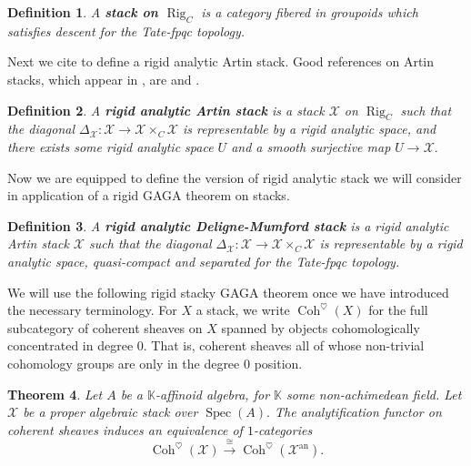 \documentclass[11pt]{amsart}
\newtheorem{theorem}{Theorem}[section]
\newtheorem{definition}[theorem]{Definition}
\theoremstyle{definition}
\numberwithin{equation}{section}
\newcommand{\Spec}{\operatorname{Spec}} 	%
\newcommand{\sX}{\mathscr{X}}		%
\newcommand{\bbK}{\mathbb{K}}		%
\begin{document}
		\begin{definition}
			A \textbf{stack on $\operatorname{Rig}_C$} is a category fibered in groupoids which satisfies descent for the Tate-fpqc topology. 
		\end{definition}
		
		Next we cite \cite{Emerton-Gee-Hellman-categorical-p-adic-langlands} to define a rigid analytic Artin stack. Good references on Artin stacks, which appear in \cite{Artin-versal-deformations-algebraic-stacks}, are  \cite{Abramovich-Olsson-Vistoli-tame-stacks-pos-characteristic} and \cite{Abramovich-Olsson-Vistoli-twisted-stable-maps-tame-Artin-stacks}.
		
		\begin{definition}\cite[$5.1.10$]{Emerton-Gee-Hellman-categorical-p-adic-langlands}
			A \textbf{rigid analytic Artin stack} is a stack $\sX$ on $\operatorname{Rig}_C$ such that the diagonal $\Delta_{\sX}:\sX\to \sX\times_C \sX$ is representable by a rigid analytic space, and there exists some rigid analytic space $U$ and a smooth surjective map $U\to \sX.$
		\end{definition}
		
		Now we are equipped to define the version of rigid analytic stack we will consider in application of a rigid GAGA theorem on stacks. 
		
		\begin{definition}
			\label{def: rigid analytic DM stack v2}
			A \textbf{rigid analytic Deligne-Mumford stack} is a rigid analytic Artin stack $\sX$ such that the diagonal $\Delta_{\sX}:\sX\to \sX\times_C\sX$ is representable by a rigid analytic space, quasi-compact and separated for the Tate-fpqc topology. 
		\end{definition}
		
		We will use the following rigid stacky GAGA theorem once we have introduced the necessary terminology. For $X$ a stack, we write $\operatorname{Coh}^{\heartsuit}(X)$ for the full subcategory of coherent sheaves on $X$ spanned by objects cohomologically concentrated in degree $0.$ That is, coherent sheaves all of whose non-trivial cohomology groups are only in the degree $0$ position.
		
		\begin{theorem}\cite[$7.4$]{Porta-Yu-Higher-analytic-stacks-GAGA}\label{t: rigid stacky GAGA}
			Let $A$ be a $\bbK$-affinoid algebra, for $\bbK$ some non-achimedean field. Let $\sX$ be a proper algebraic stack over $\Spec(A).$ The analytification functor on coherent sheaves induces an equivalence of $1$-categories
			\[\operatorname{Coh}^{\heartsuit}(\sX)\overset{\cong}{\to} \operatorname{Coh}^{\heartsuit}(\sX^{\text{an}}).\] 
		\end{theorem}
		
\end{document}
